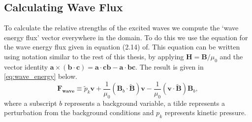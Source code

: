 \documentclass[a4paper,12pt,fourier,authoryear,custommargin]{Classes/PhDThesisPSnPDF}
\renewcommand{\vec}{\mathbf}
\providecommand{\DIFaddtex}[1]{{\protect\color{blue}\uwave{#1}}} %
\providecommand{\DIFdeltex}[1]{{\protect\color{red}\sout{#1}}}                      %
\providecommand{\DIFaddbegin}{} %
\providecommand{\DIFaddend}{} %
\providecommand{\DIFdelbegin}{} %
\providecommand{\DIFdelend}{} %
\providecommand{\DIFadd}[1]{\texorpdfstring{\DIFaddtex{#1}}{#1}} %
\providecommand{\DIFdel}[1]{\texorpdfstring{\DIFdeltex{#1}}{}} %
\begin{document}
\subsection{Calculating Wave Flux}\label{sec:waveflux}

To calculate the relative strengths of the excited waves we compute the `wave energy flux' vector everywhere in the domain.
To do this we use the equation for the wave energy flux given in equation (2.14) of\DIFaddbegin \DIFadd{~}\DIFaddend \cite{leroy1985}.
This equation can be written using notation similar to the rest of this thesis, by applying $\vec{H} = \vec{B}/\mu_0$ and the vector identity \DIFdelbegin \DIFdel{$\vec{a} \times (\vec{b} \cdot \vec{c}) = \vec{a} \cdot \vec{c}\vec{b} - \vec{a} \cdot \vec{b}\vec{c}$}\DIFdelend \DIFaddbegin \DIFadd{$\vec{a} \times (\vec{b} \times \vec{c}) = \vec{a} \cdot \vec{c}\vec{b} - \vec{a} \cdot \vec{b}\vec{c}$}\DIFaddend .
The result is given in \cref{eq:wave_energy} below.
\begin{equation}
\vec{F}_{\textbf{wave}} \equiv \widetilde{p}_k \vec{v} + \frac{1}{\mu_0} \left(\vec{B}_b \cdot \vec{\widetilde{B}}\right) \vec{v} - \frac{1}{\mu_0}\left(\vec{v} \cdot \vec{\widetilde{B}} \right) \vec{B}_b,
\label{eq:wave_energy}
\end{equation}
where a subscript $b$ represents a background variable, a tilde represents a perturbation from the background conditions and $p_k$ represents kinetic pressure.
\end{document}
